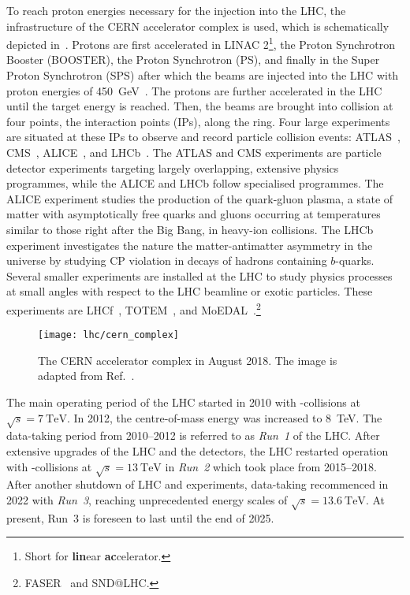 To reach proton energies necessary for the injection into the LHC, the
infrastructure of the CERN accelerator complex is used, which is schematically
depicted in~. Protons are first accelerated
in LINAC 2\footnote{Short for \textbf{lin}ear \textbf{ac}celerator.}, the Proton
Synchrotron Booster (BOOSTER), the Proton Synchrotron (PS), and finally in the
Super Proton Synchrotron (SPS) after which the beams are injected into the LHC
with proton energies of \SI{450}{\GeV}~\cite{Evans:2008zzb}. The protons are
further accelerated in the LHC until the target energy is reached. Then, the
beams are brought into collision at four points, the interaction points (IPs),
along the ring. Four large experiments are situated at these IPs to observe and
record particle collision events: ATLAS~\cite{PERF-2007-01},
CMS~\cite{CMS-CMS-00-001}, ALICE~\cite{ALICE:2008ngc}, and
LHCb~\cite{LHCb:2008vvz}. The ATLAS and CMS experiments are particle detector
experiments targeting largely overlapping, extensive physics programmes, while
the ALICE and LHCb follow specialised programmes. The ALICE experiment studies
the production of the quark-gluon plasma, a state of matter with asymptotically
free quarks and gluons occurring at temperatures similar to those right after
the Big Bang, in heavy-ion collisions. The LHCb experiment investigates the
nature the matter-antimatter asymmetry in the universe by studying CP violation
in decays of hadrons containing $b$-quarks. Several smaller experiments are
installed at the LHC to study physics processes at small angles with respect to
the LHC beamline or exotic particles. These experiments are
LHCf~\cite{LHCf:2008lfy}, TOTEM~\cite{TOTEM:2008lue}, and
MoEDAL~\cite{MoEDAL:2009jwa}.\footnote{FASER~\cite{FASER:2019aik} and SND@LHC.}

\begin{figure}[htbp]
  \centering

  \texttt{[image: lhc/cern\_complex]}

  \caption{The CERN accelerator complex in August 2018. The image is adapted
    from Ref.~\cite{Mobs:2684277}.}%
  \label{fig:cern_accelerator_complex}

\end{figure}

The main operating period of the LHC started in 2010 with \pp-collisions at
$\sqrt{s} = \SI{7}{\TeV}$. In 2012, the centre-of-mass energy was increased to
\SI{8}{\TeV}. The data-taking period from 2010--2012 is referred to as
\emph{Run~1} of the LHC. After extensive upgrades of the LHC and the detectors,
the LHC restarted operation with \pp-collisions at $\sqrt{s} = \SI{13}{\TeV}$ in
\emph{Run~2} which took place from 2015--2018. After another shutdown of LHC and
experiments, data-taking recommenced in 2022 with \emph{Run~3}, reaching
unprecedented energy scales of $\sqrt{s} = \SI{13.6}{\TeV}$. At present, Run~3
is foreseen to last until the end of 2025.

